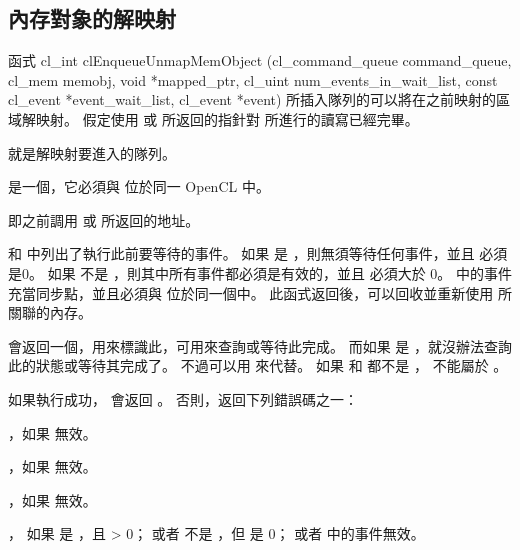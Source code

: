 \subsection{內存對象的解映射}
函式
\startclc
cl_int clEnqueueUnmapMemObject (cl_command_queue command_queue,
			cl_mem memobj,
			void *mapped_ptr,
			cl_uint num_events_in_wait_list,
			const cl_event *event_wait_list,
			cl_event *event)
\stopclc
所插入隊列的可以將在之前映射的區域解映射。
假定使用  或  所返回的指針對  所進行的讀寫已經完畢。

 就是解映射要進入的隊列。

 是一個，它必須與  位於同一 OpenCL 中。

 即之前調用  或  所返回的地址。

 和  中列出了執行此前要等待的事件。
如果  是 ，則無須等待任何事件，並且  必須是0。
如果  不是 ，則其中所有事件都必須是有效的，並且  必須大於 0。
 中的事件充當同步點，並且必須與  位於同一個中。
此函式返回後，可以回收並重新使用  所關聯的內存。

 會返回一個，用來標識此，可用來查詢或等待此完成。
而如果  是 ，就沒辦法查詢此的狀態或等待其完成了。
不過可以用  來代替。
如果  和  都不是 ，  不能屬於 。

如果執行成功，  會返回 。
否則，返回下列錯誤碼之一：
\startigBase
\item {}，如果  無效。
\item {}，如果  無效。

\item {}，如果  無效。

\item {}，
  如果  是 ，且  > 0；
  或者  不是 ，但  是 0；
  或者  中的事件無效。

